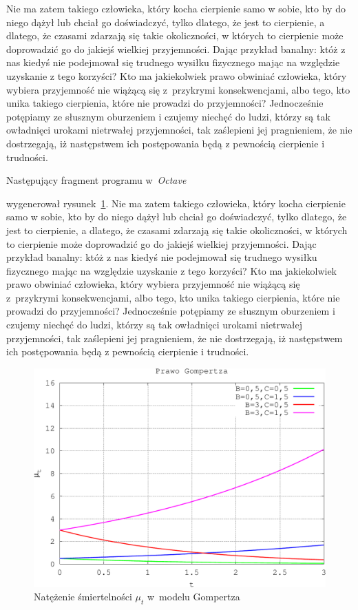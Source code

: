 \documentclass[12pt]{mwbk}
\theoremstyle{plain}
\theoremstyle{definition}
\theoremstyle{remark}
\newcommand\zrodlo[1]{\par\vspace{-3mm}{\small\textit{Źródło: }#1 }}
\begin{document}
Nie ma zatem takiego człowieka, który kocha cierpienie samo w sobie, 
kto by do niego dążył lub chciał go doświadczyć, tylko dlatego, że
jest to cierpienie, a dlatego, że czasami zdarzają się takie 
okoliczności, w których to cierpienie może doprowadzić 
go do jakiejś wielkiej przyjemności. 
Dając przykład banalny: któż z nas kiedyś nie podejmował 
się trudnego wysiłku fizycznego mając na względzie 
uzyskanie z tego korzyści? 
Kto ma jakiekolwiek prawo obwiniać człowieka, 
który wybiera przyjemność nie wiążącą się z~przykrymi 
konsekwencjami, albo tego, kto unika takiego cierpienia, 
które nie prowadzi do przyjemności? 
Jednocześnie potępiamy ze słusznym oburzeniem i czujemy 
niechęć do ludzi, którzy są tak owładnięci urokami nietrwałej 
przyjemności, tak zaślepieni jej pragnieniem, 
że nie dostrzegają, iż następstwem ich 
postępowania będą z pewnością cierpienie i trudności.

Następujący fragment programu w~\emph{Octave}

wygenerował rysunek~\ref{fig:gompertz}.
Nie ma zatem takiego człowieka, który kocha cierpienie samo w sobie, 
kto by do niego dążył lub chciał go doświadczyć, tylko dlatego, że
jest to cierpienie, a dlatego, że czasami zdarzają się takie 
okoliczności, w których to cierpienie może doprowadzić 
go do jakiejś wielkiej przyjemności. 
Dając przykład banalny: któż z nas kiedyś nie podejmował 
się trudnego wysiłku fizycznego mając na względzie 
uzyskanie z tego korzyści? 
Kto ma jakiekolwiek prawo obwiniać człowieka, 
który wybiera przyjemność nie wiążącą się z~przykrymi 
konsekwencjami, albo tego, kto unika takiego cierpienia, 
które nie prowadzi do przyjemności? 
Jednocześnie potępiamy ze słusznym oburzeniem i czujemy 
niechęć do ludzi, którzy są tak owładnięci urokami nietrwałej 
przyjemności, tak zaślepieni jej pragnieniem, 
że nie dostrzegają, iż następstwem ich 
postępowania będą z pewnością cierpienie i trudności.

\begin{figure}[htbp]
  \centering
  \includegraphics[width=0.9\linewidth]{rys/gom-crop.pdf}
  \caption{Natężenie śmiertelności $\mu_t$ w~modelu Gompertza}
  \label{fig:gompertz}
  \zrodlo{Opracowanie własne}
\end{figure}
\end{document}
